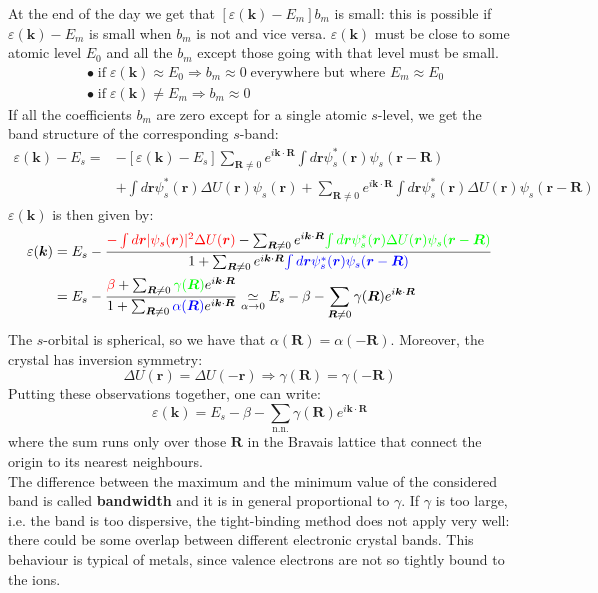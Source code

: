 \documentclass[10.75pt,a4paper,openright,bottom=2cm]{article}
\renewcommand{\Vec}[1]{\boldsymbol{#1}}
\begin{document}
At the end of the day we get that $[\varepsilon(\Vec{k})-E_m]b_m$ is small: this is possible if $\varepsilon(\Vec{k})-E_m$ is small when $b_m$ is not and vice versa. $\varepsilon(\Vec{k})$ must be close to some atomic level $E_0$ and all the $b_m$ except those going with that level must be small.
\[
\begin{aligned}
&\bullet\;\text{if}\;\varepsilon(\Vec{k})\approx E_0 \Rightarrow b_m\approx0\;\text{everywhere but where $E_m\approx E_0$}\\ &\bullet\;\text{if}\;\varepsilon(\Vec{k})\neq E_m\Rightarrow b_m\approx0
\end{aligned}
\]
If all the coefficients $b_m$ are zero except for a single atomic $s$-level, we get the band structure of the corresponding $s$-band:
\begin{align*}
\varepsilon(\Vec{k})-E_s=&-[\varepsilon(\Vec{k})-E_s]\sum_{\Vec{R}\neq0}e^{i\Vec{k}\cdot\Vec{R}}\int d\Vec{r}\psi_s^*(\Vec{r})\psi_s(\Vec{r}-\Vec{R})\\
&+\int d\Vec{r}\psi_s^*(\Vec{r})\Delta U(\Vec{r})\psi_s(\Vec{r})+\sum_{\Vec{R}\neq0}e^{i\Vec{k}\cdot\Vec{R}}\int d\Vec{r}\psi_s^*(\Vec{r})\Delta U(\Vec{r})\psi_s(\Vec{r}-\Vec{R})
\end{align*}
$\varepsilon(\Vec{k})$ is then given by:
\begin{align*}
\varepsilon(\Vec{k})&=E_s-\frac{{\color{red}{-\int d\Vec{r}|\psi_s(\Vec{r})|^2\Delta U(\Vec{r})}}-\sum_{\Vec{R}\neq0}e^{i\Vec{k}\cdot\Vec{R}}{\color{green}{\int d\Vec{r}\psi_s^*(\Vec{r})\Delta U(\Vec{r})\psi_s(\Vec{r}-\Vec{R})}}}{1+\sum_{\Vec{R}\neq0}e^{i\Vec{k}\cdot\Vec{R}}{\color{blue}{\int d\Vec{r}\psi_s^*(\Vec{r})\psi_s(\Vec{r}-\Vec{R})}}}\\
&=E_s-\frac{{\color{red}{\beta}}+\sum_{\Vec{R}\neq0}{\color{green}{\gamma(\Vec{R})}}e^{i\Vec{k}\cdot\Vec{R}}}{1+\sum_{\Vec{R}\neq0}{\color{blue}{\alpha(\Vec{R})}}e^{i\Vec{k}\cdot\Vec{R}}}\underset{\alpha\to0}{\simeq}E_s-\beta-\sum_{\Vec{R}\neq0}\gamma(\Vec{R})e^{i\Vec{k}\cdot\Vec{R}}
\end{align*}
The $s$-orbital is spherical, so we have that $\alpha(\Vec{R})=\alpha(-\Vec{R})$. Moreover, the crystal has inversion symmetry:
\[
\Delta U(\Vec{r})=\Delta U(-\Vec{r})\Rightarrow\gamma(\Vec{R})=\gamma(-\Vec{R})
\]
Putting these observations together, one can write:
\[
\varepsilon(\Vec{k})=E_s-\beta-\sum_{\text{n.n.}}\gamma(\Vec{R})e^{i\Vec{k}\cdot\Vec{R}}
\]
where the sum runs only over those $\Vec{R}$ in the Bravais lattice that connect the origin to its nearest neighbours.\\
The difference between the maximum and the minimum value of the considered band is called \textbf{bandwidth} and it is in general proportional to $\gamma$. If $\gamma$ is too large, i.e. the band is too dispersive, the tight-binding method does not apply very well: there could be some overlap between different electronic crystal bands. This behaviour is typical of metals, since valence electrons are not so tightly bound to the ions.
\newpage
\end{document}

